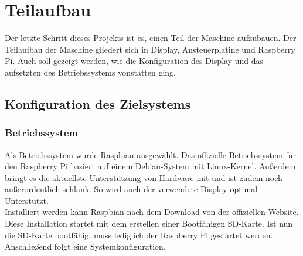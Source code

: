 \section{Teilaufbau}
Der letzte Schritt dieses Projekts ist es, einen Teil der Maschine aufzubauen.
Der Teilaufbau der Maschine gliedert sich in Display, Ansteuerplatine und Raspberry Pi.
Auch soll gezeigt werden, wie die Konfiguration des Display und das aufsetzten des Betriebssystems vonstatten ging.
\subsection{Konfiguration des Zielsystems}
\subsubsection{Betriebssystem}
Als Betriebssystem wurde Raspbian ausgewählt.
Das offizielle Betriebssystem für den Raspberry Pi basiert auf einem Debian-System mit Linux-Kernel.
Außerdem bringt es die aktuellste Unterstützung von Hardware mit und ist zudem noch außerordentlich schlank.
So wird auch der verwendete Display optimal Unterstützt.\\
Installiert werden kann Raspbian nach dem Download von der offiziellen Website.
Diese Installation startet mit dem erstellen einer Bootfähigen SD-Karte.
Ist nun die SD-Karte bootfähig, muss lediglich der Raspberry Pi gestartet werden.
Anschließend folgt eine Systemkonfiguration.

